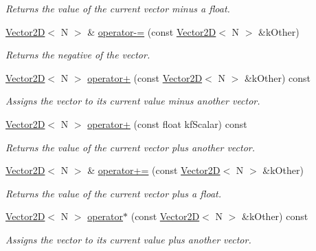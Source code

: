 \begin{DoxyCompactItemize}
\begin{DoxyCompactList}\small\item\em Returns the value of the current vector minus a float. \end{DoxyCompactList}\item 
\hyperlink{class_vector2_d}{Vector2\+D}$<$ N $>$ \& \hyperlink{class_vector2_d_a5db96bd2de56c4f1ebd426cfb4593e52}{operator-\/=} (const \hyperlink{class_vector2_d}{Vector2\+D}$<$ N $>$ \&k\+Other)
\begin{DoxyCompactList}\small\item\em Returns the negative of the vector. \end{DoxyCompactList}\item 
\hyperlink{class_vector2_d}{Vector2\+D}$<$ N $>$ \hyperlink{class_vector2_d_ac8f9fe8f4943e434537d67674265b388}{operator+} (const \hyperlink{class_vector2_d}{Vector2\+D}$<$ N $>$ \&k\+Other) const 
\begin{DoxyCompactList}\small\item\em Assigns the vector to its current value minus another vector. \end{DoxyCompactList}\item 
\hyperlink{class_vector2_d}{Vector2\+D}$<$ N $>$ \hyperlink{class_vector2_d_a450bb0c2588ff34f60edeb6d8d7d184f}{operator+} (const float kf\+Scalar) const 
\begin{DoxyCompactList}\small\item\em Returns the value of the current vector plus another vector. \end{DoxyCompactList}\item 
\hyperlink{class_vector2_d}{Vector2\+D}$<$ N $>$ \& \hyperlink{class_vector2_d_ad33289edb9a8c7e62aba24aaf3a28fef}{operator+=} (const \hyperlink{class_vector2_d}{Vector2\+D}$<$ N $>$ \&k\+Other)
\begin{DoxyCompactList}\small\item\em Returns the value of the current vector plus a float. \end{DoxyCompactList}\item 
\hyperlink{class_vector2_d}{Vector2\+D}$<$ N $>$ \hyperlink{class_vector2_d_a4577730fdb261a2e56065ee23ee551e3}{operator$\ast$} (const \hyperlink{class_vector2_d}{Vector2\+D}$<$ N $>$ \&k\+Other) const 
\begin{DoxyCompactList}\small\item\em Assigns the vector to its current value plus another vector. \end{DoxyCompactList}\item 

\end{DoxyCompactItemize}
